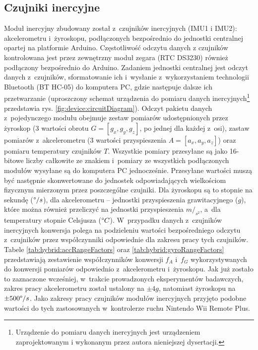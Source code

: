 \subsection{Czujniki inercyjne}
Moduł inercyjny zbudowany został z~czujników inercyjnych (IMU1 i IMU2): akcelerometru i~żyroskopu, podłączonych bezpośrednio do jednostki centralnej opartej na platformie Arduino. Częstotliwość odczytu danych z czujników kontrolowana jest przez zewnętrzny moduł zegara (RTC DS3230) również podłączony bezpośrednio do Arduino. Zadaniem jednostki centralnej jest odczyt danych z~czujników, sformatowanie ich i~wysłanie z~wykorzystaniem technologii Bluetooth (BT HC-05) do komputera PC, gdzie następuje dalsze ich przetwarzanie (uproszczony schemat urządzenia do pomiaru danych inercyjnych\footnote{Urządzenie do pomiaru danych inercyjnych jest urządzeniem zaprojektowanym i wykonanym przez autora nieniejszej dysertacji.} przedstawia rys. \ref{fig:device:circuitDiagram}). Odczyt pakietu danych z~pojedynczego modułu obejmuje zestaw pomiarów udostępnionych przez żyroskop (3 wartości obrotu $G = [g_x, g_y, g_z]$, po jednej dla każdej z~osi), zastaw pomiarów z~akcelerometru (3 wartości przyspieszenia $A = [a_x, a_y, a_z]$) oraz pomiaru temperatury czujników $T$. Wszystkie pomiary przesyłane są jako 16-bitowe liczby całkowite ze znakiem i~pomiary ze wszystkich podłączonych modułów wysyłane są do komputera PC jednocześnie. Przesyłane wartości muszą być następnie skonwertowane do jednostek odpowiadających wielkościom fizycznym mierzonym przez poszczególne czujniki. Dla żyroskopu są to stopnie na sekundę ($\degree/s$), dla akcelerometru -- jednostki przyspieszenia grawitacyjnego ($g$), które można również przeliczyć na jednostki przyspieszenia $m/_{s^2}$, a~dla temperatury stopnie Celsjusza ($\degree C$). W~przypadku danych z~czujników inercyjnych konwersja polega na podzieleniu wartości bezpośredniego odczytu z~czujników przez współczynniki odpowiednie dla zakresu pracy tych czujników. Tabele \ref{tab:hybrid:accRangeFactors} oraz \ref{tab:hybrid:gyroRangeFactors} przedstawiają zestawienie współczynników konwersji $f_A$ i~$f_G$ wykorzystywanych do konwersji pomiarów odpowiednio z~akcelerometru i~żyroskopu. Jak już zostało to zaznaczone wcześniej, w~trakcie prowadzonych eksperymentów badawczych, zakres pracy akcelerometru został ustalony na $\pm4g$, natomiast żyroskopu na $\pm500\degree/s$. Jako zakresy pracy czujników modułów inercyjnych przyjęto podobne wartości do tych zastosowanych w~kontrolerze ruchu Nintendo Wii Remote Plus. 
		

		

